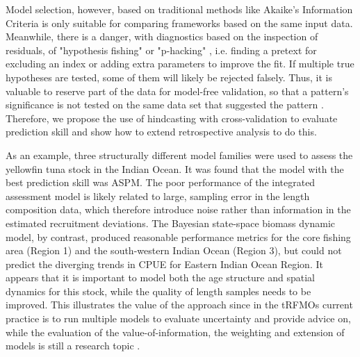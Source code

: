 \documentclass[12pt,halfline,a4paper,nonumbib]{ouparticle}
\begin{document}
Model selection, however, based on traditional methods like Akaike’s Information Criteria  \parencite[AIC,][]{akaike1998information} is only suitable for comparing frameworks based on the same input data. Meanwhile, there is a danger, with diagnostics based on the inspection of residuals, of "hypothesis fishing" or "p-hacking" \parencite{wasserstein2016asa,head2015extent}, i.e. finding a pretext for excluding an index or adding extra parameters \parencite[e.g.][]{schirripa2017hypothesis} to improve the fit. If multiple true hypotheses are tested, some of them will likely be rejected falsely. Thus, it is valuable to reserve part of the data for model-free validation, so that a pattern’s significance is not tested on the same data set that suggested the pattern \parencite{arlot2010survey}. Therefore, we propose the use of hindcasting with cross-validation to evaluate prediction skill and show how to extend retrospective analysis to do this.

As an example, three structurally different model families were used to assess the yellowfin tuna stock in the Indian Ocean. It was found that the model with the best prediction skill was ASPM. The poor performance of the integrated assessment model is likely related to large, sampling error in the length composition data, which therefore introduce noise rather than information in the estimated recruitment deviations. The Bayesian state-space biomass dynamic model, by contrast, produced reasonable performance metrics for the core fishing area (Region 1) and the south-western Indian Ocean (Region 3), but could not predict the diverging trends in CPUE for Eastern Indian Ocean Region. It appears that it is important to model both the age structure and spatial dynamics for this stock, while the quality of length samples needs to be improved. This illustrates the value of the approach since in the tRFMOs current practice is to run multiple models to evaluate uncertainty and provide advice on, while the evaluation of the value-of-information, the weighting and extension of models is still a research topic \cite{kell2016quantification}. 
\end{document}

